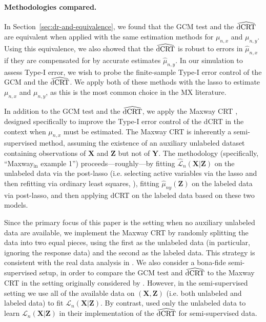 \documentclass[12pt]{article}
\theoremstyle{definition}
\theoremstyle{remark}
\newcommand{\prx}{\bm X}								%
\newcommand{\prz}{\bm Z}								%
\newcommand{\pry}{{\bm Y}}								%
\newcommand{\law}{\mathcal L}							%
\newcommand{\lawhat}{\widehat{\mathcal L}}				%
\newcommand{\dCRThat}{\widehat{\textnormal{dCRT}}}		%
\begin{document}
	\paragraph{Methodologies compared.}
	
	In Section~\ref{sec:dr-and-equivalence}, we found that the GCM test and the $\dCRThat$ are equivalent when applied with the same estimation methods for $\mu_{n,x}$ and $\mu_{n,y}$. Using this equivalence, we also showed that the $\dCRThat$ is robust to errors in $\widehat \mu_{n,x}$ if they are compensated for by accurate estimates $\widehat \mu_{n,y}$. In our simulation to assess Type-I error, we wish to probe the finite-sample Type-I error control of the GCM and the $\dCRThat$. We apply both of these methods with the lasso to estimate $\mu_{n,x}$ and $\mu_{n,y}$, as this is the most common choice in the MX literature.
	
	In addition to the GCM test and the $\dCRThat$, we apply the Maxway CRT \citep{Li2022}, designed specifically to improve the Type-I error control of the dCRT in the context when $\mu_{n,x}$ must be estimated. The Maxway CRT is inherently a semi-supervised method, assuming the existence of an auxiliary unlabeled dataset containing observations of $\prx$ and $\prz$ but not of $\pry$. The methodology (specifically, ``Maxway$_{\text{in}}$ example 1'') proceeds---roughly---by fitting $\lawhat_n(\prx|\prz)$ on the unlabeled data via the post-lasso (i.e. selecting active variables via the lasso and then refitting via ordinary least squares, \cite{Belloni2013}), fitting $\widehat \mu_{ny}(\prz)$ on the labeled data via post-lasso, and then applying dCRT on the labeled data based on these two models.
	
	Since the primary focus of this paper is the setting when no auxiliary unlabeled data are available, we implement the Maxway CRT by randomly splitting the data into two equal pieces, using the first as the unlabeled data (in particular, ignoring the response data) and the second as the labeled data. This strategy is consistent with the real data analysis in \citet[Section 6]{Li2022}. We also consider a bona-fide semi-supervised setup, in order to compare the GCM test and $\dCRThat$ to the Maxway CRT in the setting originally considered by \citet{Li2022}. However, in the semi-supervised setting we use all of the available data on $(\prx, \prz)$ (i.e. both unlabeled and labeled data) to fit $\law_n(\prx|\prz)$. By contrast, \citet{Li2022} used only the unlabeled data to learn $\law_n(\prx|\prz)$ in their implementation of the $\dCRThat$ for semi-supervised data.
	
\end{document}
